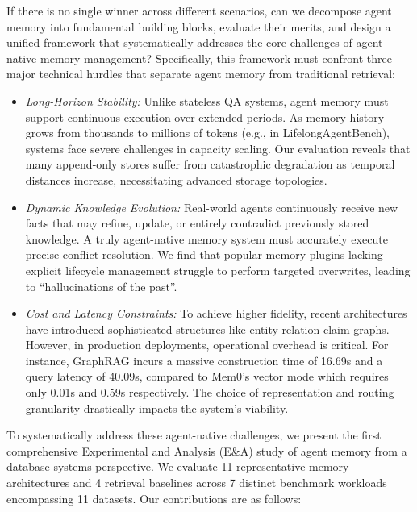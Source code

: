 If there is no single winner across different scenarios, can we decompose agent memory into fundamental building blocks, evaluate their merits, and design a unified framework that systematically addresses the core challenges of agent-native memory management? Specifically, this framework must confront three major technical hurdles that separate agent memory from traditional retrieval:
\begin{itemize}[leftmargin=*, topsep=0pt, itemsep=2pt]
    \item \textit{Long-Horizon Stability:} Unlike stateless QA systems, agent memory must support continuous execution over extended periods. As memory history grows from thousands to millions of tokens (e.g., in LifelongAgentBench), systems face severe challenges in capacity scaling. Our evaluation reveals that many append-only stores suffer from catastrophic degradation as temporal distances increase, necessitating advanced storage topologies.
    \item \textit{Dynamic Knowledge Evolution:} Real-world agents continuously receive new facts that may refine, update, or entirely contradict previously stored knowledge. A truly agent-native memory system must accurately execute precise conflict resolution. We find that popular memory plugins lacking explicit lifecycle management struggle to perform targeted overwrites, leading to ``hallucinations of the past''.
    \item \textit{Cost and Latency Constraints:} To achieve higher fidelity, recent architectures have introduced sophisticated structures like entity-relation-claim graphs. However, in production deployments, operational overhead is critical. For instance, GraphRAG incurs a massive construction time of 16.69s and a query latency of 40.09s, compared to Mem0's vector mode which requires only 0.01s and 0.59s respectively. The choice of representation and routing granularity drastically impacts the system's viability.
\end{itemize}

 To systematically address these agent-native challenges, we present the first comprehensive Experimental and Analysis (E\&A) study of agent memory from a database systems perspective. We evaluate 11 representative memory architectures and 4 retrieval baselines across 7 distinct benchmark workloads encompassing 11 datasets. Our contributions are as follows:

